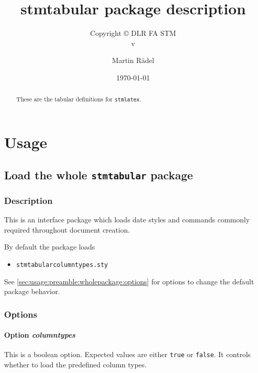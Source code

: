 \documentclass[%
  type=article,%
  layout=koma,%
  date=true,%
  hyperref=true,%
  listings=true,%
  math=true,%
]{stmtext}
\author{Martin R\"{a}del}
\title{stmtabular package description}
\subtitle{Copyright \copyright{} \the\year{} DLR FA STM\\v\formatdate[versiondatestyle]{\DTMToday}}
\date{\today}
\begin{document}
\maketitle

\begin{abstract}
These are the tabular definitions for \texttt{stmlatex}.
\end{abstract}

\tableofcontents

\section{Usage}%

\subsection{Load the whole \protect\texttt{stmtabular} package}
\label{sec:usage:preamble:wholepackage}

\subsubsection{Description}
\label{sec:usage:preamble:wholepackage:description}

This is an interface package which loads date styles and commands commonly required throughout document creation.

By default the package loads

\begin{itemize}[noitemsep]
  \item \verb+stmtabularcolumntypes.sty+
\end{itemize}

See \autoref{sec:usage:preamble:wholepackage:options} for options to change the default package behavior.

\subsubsection{Options}
\label{sec:usage:preamble:wholepackage:options}

\paragraph{Option \protect\textit{columntypes}} 
\label{sec:usage:preamble:wholepackage:options:columntypes}

This is a boolean option. Expected values are either \texttt{true} or \texttt{false}. It controls whether to load the predefined column types.
\end{document}
